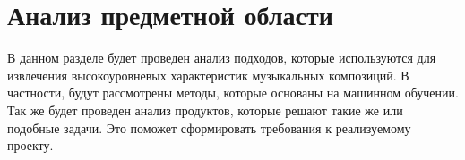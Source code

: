 \section{Анализ предметной области}
\label{sec:analysis}

В данном разделе будет проведен анализ подходов, которые используются для извлечения высокоуровневых характеристик музыкальных композиций. В частности, будут рассмотрены методы, которые основаны на машинном обучении. Так же будет проведен анализ продуктов, которые решают такие же или подобные задачи. Это поможет сформировать требования к реализуемому проекту.






